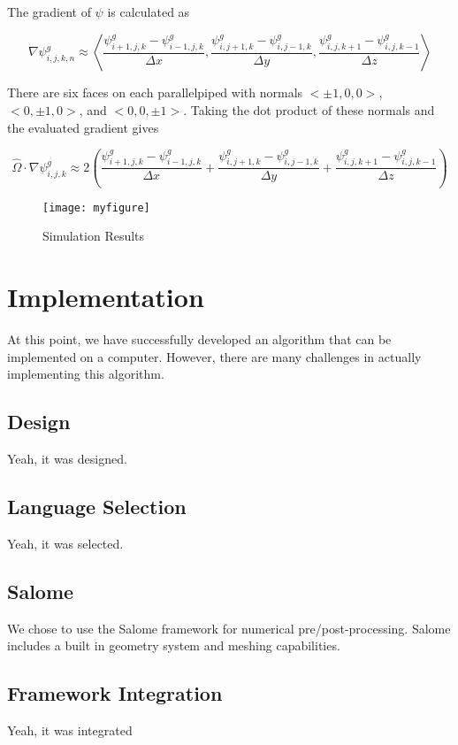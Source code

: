 \documentclass{article}
\numberwithin{equation}{subsection}
\begin{document}
The gradient of $\psi$ is calculated as

\begin{equation}
\nabla \psi_{i,j,k,n}^g \approx
\left\langle  
\frac{\psi_{i+1,j,k}^g - \psi_{i-1,j,k}^g}{\Delta x},
\frac{\psi_{i,j+1,k}^g - \psi_{i,j-1,k}^g}{\Delta y},
\frac{\psi_{i,j,k+1}^g - \psi_{i,j,k-1}^g}{\Delta z}
\right\rangle
\end{equation}

There are six faces on each parallelpiped with normals $<\pm 1, 0, 0>$, $<0, \pm 1, 0>$, and $<0, 0, \pm 1>$. Taking the dot product of these normals and the evaluated gradient gives

\begin{equation}
\hat{\Omega} \cdot \nabla \psi_{i,j,k}^g \approx
2 \left(
\frac{\psi_{i+1,j,k}^g - \psi_{i-1,j,k}^g}{\Delta x} +
\frac{\psi_{i,j+1,k}^g - \psi_{i,j-1,k}^g}{\Delta y} +
\frac{\psi_{i,j,k+1}^g - \psi_{i,j,k-1}^g}{\Delta z}
\right)
\end{equation}

\begin{figure}
    \centering
    \texttt{[image: myfigure]}
    \caption{Simulation Results}
    \label{simulationfigure}
\end{figure}

\section{Implementation}
At this point, we have successfully developed an algorithm that can be implemented on a computer. However, there are many challenges in actually implementing this algorithm.

\subsection{Design}
Yeah, it was designed.

\subsection{Language Selection}
Yeah, it was selected.

\subsection{Salome}
We chose to use the Salome framework for numerical pre/post-processing. Salome includes a built in geometry system and meshing capabilities.

\subsection{Framework Integration}
Yeah, it was integrated
\end{document}
